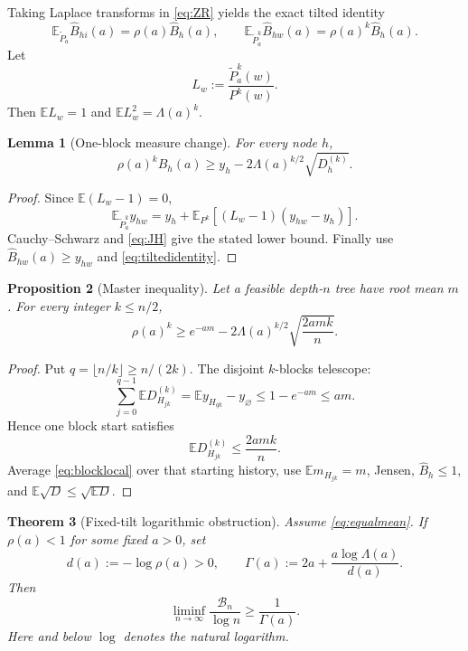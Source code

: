\documentclass[11pt,a4paper]{article}
\newtheorem{theorem}{Theorem}[section]
\newtheorem{proposition}[theorem]{Proposition}
\newtheorem{lemma}[theorem]{Lemma}
\theoremstyle{definition}
\theoremstyle{remark}
\newcommand{\E}{\mathbb E}
\newcommand{\cB}{\mathcal B}
\begin{document}
Taking Laplace transforms in \eqref{eq:ZR} yields the exact tilted identity
\begin{equation}
 \boxed{
 \E_{\widetilde P_a}\widehat B_{hi}(a)
 =\rho(a)\widehat B_h(a),
 }
 \qquad
 \boxed{
 \E_{\widetilde P_a^k}\widehat B_{hw}(a)
 =\rho(a)^k\widehat B_h(a).
 }
 \label{eq:tiltedidentity}
\end{equation}
Let
\[
 L_w:=\frac{\widetilde P_a^k(w)}{P^k(w)}.
\]
Then \(\E L_w=1\) and \(\E L_w^2=\Lambda(a)^k\).

\begin{lemma}[One-block measure change]
For every node \(h\),
\begin{equation}
 \boxed{
 \rho(a)^k\widehat B_h(a)
 \ge y_h-2\Lambda(a)^{k/2}\sqrt{D_h^{(k)}}.
 }
 \label{eq:blocklocal}
\end{equation}
\end{lemma}

\begin{proof}
Since \(\E(L_w-1)=0\),
\[
 \E_{\widetilde P_a^k}y_{hw}
 =y_h+\E_{P^k}[(L_w-1)(y_{hw}-y_h)].
\]
Cauchy--Schwarz and \eqref{eq:JH} give the stated lower bound.  Finally use
\(\widehat B_{hw}(a)\ge y_{hw}\) and \eqref{eq:tiltedidentity}.
\end{proof}

\begin{proposition}[Master inequality]
Let a feasible depth-\(n\) tree have root mean \(m\).  For every integer
\(k\le n/2\),
\begin{equation}
 \boxed{
 \rho(a)^k
 \ge e^{-am}
 -2\Lambda(a)^{k/2}\sqrt{\frac{2amk}{n}}.
 }
 \label{eq:master}
\end{equation}
\end{proposition}

\begin{proof}
Put \(q=\lfloor n/k\rfloor\ge n/(2k)\).  The disjoint \(k\)-blocks telescope:
\[
 \sum_{j=0}^{q-1}\E D_{H_{jk}}^{(k)}
 =\E y_{H_{qk}}-y_\varnothing
 \le1-e^{-am}\le am.
\]
Hence one block start satisfies
\[
 \E D_{H_{jk}}^{(k)}\le\frac{2amk}{n}.
\]
Average \eqref{eq:blocklocal} over that starting history, use
\(\E m_{H_{jk}}=m\), Jensen, \(\widehat B_h\le1\), and
\(\E\sqrt D\le\sqrt{\E D}\).
\end{proof}

\begin{theorem}[Fixed-tilt logarithmic obstruction]
\label{thm:fixedtilt}
Assume \eqref{eq:equalmean}.  If \(\rho(a)<1\) for some fixed \(a>0\), set
\[
 d(a):=-\log\rho(a)>0,
 \qquad
 \Gamma(a):=2a+\frac{a\log\Lambda(a)}{d(a)}.
\]
Then
\begin{equation}
 \boxed{
 \liminf_{n\to\infty}\frac{\cB_n}{\log n}
 \ge\frac1{\Gamma(a)}.
 }
 \label{eq:fixedbound}
\end{equation}
Here and below \(\log\) denotes the natural logarithm.
\end{theorem}
\end{document}
